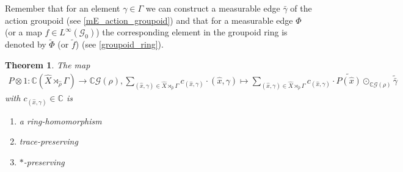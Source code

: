 \documentclass[12pt,a4paper]{scrartcl}
\theoremstyle{plain}
\newtheorem{Theorem}{Theorem}[subsection]
\theoremstyle{definition}
\newcommand{\C}{\mathbb{C}} %
\newcommand{\2}{\mathbb{Z} / 2 \mathbb{Z}}
\newcommand{\G}{\mathcal{G}}
\newcommand{\1}{\bar{1}}
\newcommand{\0}{\bar{0}}
\begin{document}
Remember that for an element $\gamma \in \Gamma$ we can construct a measurable edge $\bar{\gamma}$ of the action groupoid (see \ref{mE_action_groupoid}) and that for a measurable edge $\Phi$ (or a map $f \in L^\infty (\G_0)$) the corresponding element in the groupoid ring is denoted by $\tilde{\Phi}$ (or $\tilde{f}$) (see \ref{groupoid_ring}).
\begin{Theorem}\label{map_pantryagin} 
	The map 
	\begin{align*}
		P \otimes 1\colon\C(\hat{X} \rtimes_{\hat{\rho}} \Gamma) \to \C\G(\rho), 
		\sum_{(\hat{x}, \gamma) \in \hat{X} \rtimes_{\hat{\rho}} \Gamma}
		 c_{(\hat{x}, \gamma)} \cdot (\hat{x}, \gamma) \mapsto 
		 \sum_{(\hat{x}, \gamma) \in \hat{X} \rtimes_{\hat{\rho}} \Gamma} 
		 c_{(\hat{x}, \gamma)} \cdot \widetilde{P(\hat{x})} \odot_{\C\G(\rho)} \widetilde{\bar{\gamma}} 
	\end{align*}
	 with $c_{(\hat{x}, \gamma)} \in \C$ is
	\begin{enumerate}
		\item a ring-homomorphism \label{i}
		\item trace-preserving \label{ii}
		\item $*$-preserving \label{iii}
	\end{enumerate}
\end{Theorem} 
\end{document}

